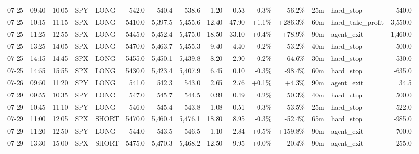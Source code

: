 \documentclass[11pt,a4paper,twoside]{article}
\begin{document}
\begin{landscape}
\begin{center}
\begin{longtable}{>{\color{txtmain}}l l l l l r r r r r r r r >{\color{txtmain}}l r}
07-25 & 09:40 & 10:05 & SPY & LONG & 542.0 & 540.4 & 538.6 & 1.20 & 0.53 & \textcolor{lossred}{-0.3\%} & \textcolor{lossred}{-56.2\%} & 25m & hard\_stop & \textcolor{lossred}{-540.0} \\
07-25 & 10:15 & 11:15 & SPX & LONG & 5410.0 & 5,397.5 & 5,455.6 & 12.40 & 47.90 & \textcolor{wingreen}{+1.1\%} & \textcolor{wingreen}{+286.3\%} & 60m & hard\_take\_profit & \textcolor{wingreen}{3,550.0} \\
07-25 & 11:25 & 12:55 & SPX & LONG & 5445.0 & 5,452.4 & 5,475.0 & 18.50 & 33.10 & \textcolor{wingreen}{+0.4\%} & \textcolor{wingreen}{+78.9\%} & 90m & agent\_exit & \textcolor{wingreen}{1,460.0} \\
07-25 & 13:25 & 14:05 & SPX & LONG & 5470.0 & 5,463.7 & 5,455.3 & 9.40 & 4.40 & \textcolor{lossred}{-0.2\%} & \textcolor{lossred}{-53.2\%} & 40m & hard\_stop & \textcolor{lossred}{-500.0} \\
07-25 & 14:15 & 14:45 & SPX & LONG & 5455.0 & 5,450.1 & 5,439.8 & 8.20 & 2.90 & \textcolor{lossred}{-0.2\%} & \textcolor{lossred}{-64.6\%} & 30m & hard\_stop & \textcolor{lossred}{-530.0} \\
07-25 & 14:55 & 15:55 & SPX & LONG & 5430.0 & 5,423.4 & 5,407.9 & 6.45 & 0.10 & \textcolor{lossred}{-0.3\%} & \textcolor{lossred}{-98.4\%} & 60m & hard\_stop & \textcolor{lossred}{-635.0} \\
07-26 & 09:50 & 11:20 & SPY & LONG & 541.0 & 542.3 & 543.0 & 2.65 & 2.76 & \textcolor{wingreen}{+0.1\%} & \textcolor{wingreen}{+4.3\%} & 90m & agent\_exit & \textcolor{wingreen}{34.5} \\
07-29 & 09:55 & 10:35 & SPY & LONG & 547.0 & 545.7 & 544.5 & 0.99 & 0.49 & \textcolor{lossred}{-0.2\%} & \textcolor{lossred}{-50.3\%} & 40m & hard\_stop & \textcolor{lossred}{-500.0} \\
07-29 & 10:45 & 11:10 & SPY & LONG & 546.0 & 545.4 & 543.8 & 1.08 & 0.51 & \textcolor{lossred}{-0.3\%} & \textcolor{lossred}{-53.5\%} & 25m & hard\_stop & \textcolor{lossred}{-522.0} \\
07-29 & 11:00 & 12:05 & SPX & SHORT & 5470.0 & 5,460.4 & 5,476.1 & 18.80 & 8.95 & \textcolor{lossred}{-0.3\%} & \textcolor{lossred}{-52.4\%} & 65m & hard\_stop & \textcolor{lossred}{-985.0} \\
07-29 & 11:20 & 12:50 & SPY & LONG & 544.0 & 543.5 & 546.5 & 1.10 & 2.84 & \textcolor{wingreen}{+0.5\%} & \textcolor{wingreen}{+159.8\%} & 90m & agent\_exit & \textcolor{wingreen}{700.0} \\
07-29 & 13:30 & 15:00 & SPX & SHORT & 5475.0 & 5,470.3 & 5,468.2 & 12.50 & 9.95 & \textcolor{wingreen}{+0.0\%} & \textcolor{lossred}{-20.4\%} & 90m & agent\_exit & \textcolor{lossred}{-255.0} \\

\end{longtable}
\end{center}
\end{landscape}
\end{document}
